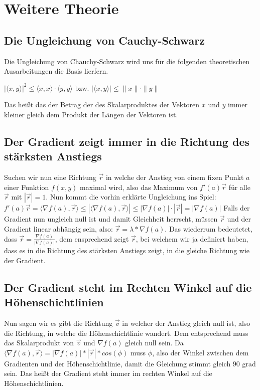 \documentclass[a4paper, 11pt]{article}
\begin{document}
\section{Weitere Theorie}
\subsection{Die Ungleichung von  Cauchy-Schwarz}
Die Ungleichung von Chauchy-Schwarz wird uns für die folgenden theoretischen Ausarbeitungen die Basis lierfern.

$|\langle x,y \rangle|^2 \leq \langle x, x\rangle \cdot \langle y,y\rangle$ bzw. $\left|\langle x,y \rangle\right| \leq \|x\| \cdot \| y\|$

Das heißt das der Betrag der des Skalarproduktes der Vektoren $x$ und $y$ immer kleiner gleich dem Produkt der Längen der Vektoren ist.
\subsection{Der Gradient zeigt immer in die Richtung des stärksten Anstiegs}
Suchen wir nun eine Richtung ${\overrightarrow{r}}$ in welche der Anstieg von einem fixen Punkt $a$ einer Funktion $f(x,y)$  maximal wird, also das Maximum von $f'(a){\overrightarrow{r}}$ für alle ${\overrightarrow{r}}$ mit $|{\overrightarrow{r}}|=1$. Nun kommt die vorhin erklärte Ungleichung ins Spiel:
$f'(a){\overrightarrow{r}}={\langle}{\nabla}f(a),\overrightarrow{r}{\rangle} {\leq} |{\langle}{\nabla}f(a),{\overrightarrow{r}}{\rangle}| {\leq} |{\nabla}f(a)|{\cdot}|{\overrightarrow{r}}|=|{\nabla}f(a)|$
Falls der Gradient nun ungleich null ist und damit Gleichheit herrscht, müssen ${\overrightarrow{r}}$ und der Gradient linear abhängig sein, also: ${\overrightarrow{r}}={\lambda}*{\nabla}f(a)$. Das wiederrum bedeutetet, dass ${\overrightarrow{r}}=\frac{{\nabla}f(a)}{|{\nabla}f(a)|}$, dem ensprechend zeigt ${\overrightarrow{r}}$, bei welchem wir ja definiert haben, dass es in die Richtung des stärksten Anstiegs zeigt, in die gleiche Richtung wie der Gradient.

\subsection{Der Gradient steht im Rechten Winkel auf die Höhenschichtlinien}
Nun sagen wir es gibt die Richtung ${\overrightarrow{v}}$ in welcher der Anstieg gleich null ist, also die Richtung, in welche die Höhenschichtlinie wandert. Dem entsprechend muss das Skalarprodukt von ${\overrightarrow{v}}$ und ${\nabla}f(a)$ gleich null sein. Da ${\langle}{\nabla}f(a),\overrightarrow{r}{\rangle} = |{\nabla}f(a)| * |\overrightarrow{r}| * cos({\phi})$ muss ${\phi}$, also der Winkel zwischen dem Gradienten und der Höhenschichtlinie, damit die Gleichung stimmt gleich $90$ grad sein. Das heißt der Gradient steht immer im rechten Winkel auf die Höhenschichtlinien.
\end{document}
